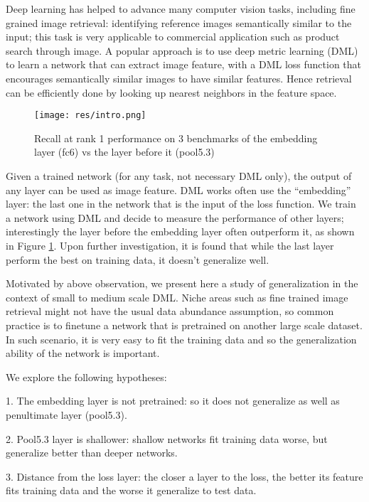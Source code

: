 \documentclass[10pt,twocolumn,letterpaper]{article}
\begin{document}
Deep learning has helped to advance many computer vision tasks, including fine grained image retrieval: identifying reference images semantically similar to the input; this task is very applicable to commercial application such as product search through image. A popular approach is  to use deep metric learning (DML) to learn a network that can extract image feature, with a DML loss function that encourages semantically similar images to have similar features. Hence retrieval can be efficiently done by looking up nearest neighbors in the feature space.


\begin{figure}
  \texttt{[image: res/intro.png]}
  \caption{Recall at rank 1 performance on 3 benchmarks of the embedding layer (fc6) vs the layer before it (pool5.3)}
  \label{fig:intro}
\end{figure}



Given a trained network (for any task, not necessary DML only), the output of any layer can be used as image feature. DML works often use the ``embedding'' layer: the last one in the network that is the input of the loss function. We train a network using DML and decide to measure the performance of other layers; interestingly the layer before the embedding layer often outperform it, as shown in Figure \ref{fig:intro}. Upon further investigation, it is found that while the last layer perform the best on training data, it doesn't generalize well.

Motivated by above observation, we present here a study of generalization in the context of small to medium scale DML. Niche areas such as fine trained image retrieval might not have the usual data abundance assumption, so common practice is to finetune a network that is pretrained on another large scale dataset. In such scenario, it is very easy to fit the training data and so the generalization ability of the network is important.

We explore the following hypotheses:

1. The embedding layer is not pretrained: so it does not generalize as well as penultimate layer (pool5.3).

2. Pool5.3 layer is shallower: shallow networks fit training data worse, but generalize better than deeper networks.

3. Distance from the loss layer: the closer a layer to the loss, the better its feature fits training data and the worse it generalize to test data.
\end{document}
